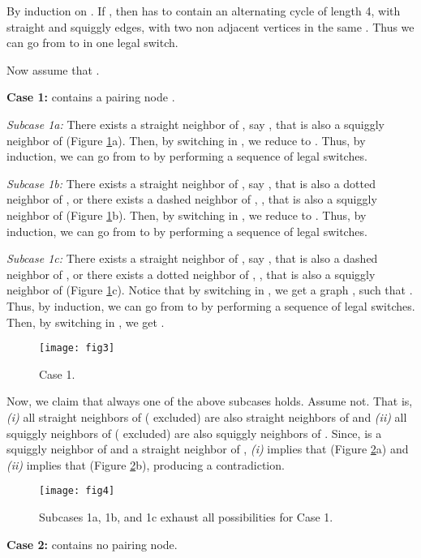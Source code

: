 \documentclass[12pt,a4paper]{article}
\theoremstyle{definition}
\theoremstyle{plain}
\newenvironment{prf}{\noindent {\bf Proof.}}{\begin{flushright}\vspace{-2em}\footnotesize\normalsize\end{flushright}\smallskip}
\begin{document}
\begin{prf}
By induction on . If , then  has to contain an alternating 
cycle of length 4, with straight and squiggly edges, with two non adjacent vertices 
in the same . Thus we can go from  to  in one legal switch.

Now assume that . 

\noindent\textbf{Case 1:}  contains a pairing node .

\noindent\emph{Subcase 1a:} There exists a straight neighbor of , say , that 
is also a squiggly neighbor of  (Figure \ref{fig3}a). Then, by switching  in , 
we reduce  to . Thus, by induction, we can go from  to  by 
performing a sequence of legal switches.

\noindent\emph{Subcase 1b:} There exists a straight neighbor of , say , that 
is also a dotted neighbor of , or there exists a dashed neighbor of , , that 
is also a squiggly neighbor of  (Figure \ref{fig3}b). Then, by switching  in , 
we reduce  to . Thus, by induction, we can go from  to  by 
performing a sequence of legal switches.

\noindent\emph{Subcase 1c:} There exists a straight neighbor of , say , that 
is also a dashed neighbor of , or there exists a dotted neighbor of , , that 
is also a squiggly neighbor of  (Figure \ref{fig3}c). Notice that by switching  
in , we get a graph , such that . Thus, by induction, 
we can go from  to  by performing a sequence of legal switches. Then, by 
switching  in , we get .

\begin{figure}[h]
\centering
\texttt{[image: fig3]}
\caption{Case 1.}
\label{fig3}
\end{figure}

Now, we claim that always one of the above subcases holds. Assume not. That is, \emph{(i)} 
all straight neighbors of  ( excluded) are also straight neighbors of  and 
\emph{(ii)} all squiggly neighbors of  ( excluded) are also squiggly neighbors 
of . Since,  is a squiggly neighbor of  and a straight neighbor of ,
\emph{(i)} implies that  (Figure \ref{fig4}a) and \emph{(ii)} implies 
that  (Figure \ref{fig4}b), producing a contradiction.\medskip

\begin{figure}[h]
\centering
\texttt{[image: fig4]}
\caption{Subcases 1a, 1b, and 1c exhaust all possibilities for Case 1.}
\label{fig4}
\end{figure}

\noindent\textbf{Case 2:}  contains no pairing node. 


\end{prf}
\end{document}

